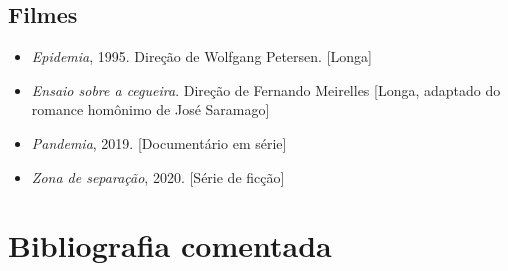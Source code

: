 \documentclass[12pt]{extarticle}
\begin{document}



\subsection{Filmes}

\begin{itemize}
\item \emph{Epidemia}, 1995. Direção de Wolfgang Petersen. {[}Longa{]}

\item \emph{Ensaio sobre a cegueira}. Direção de Fernando Meirelles {[}Longa,
adaptado do romance homônimo de José Saramago{]}

\item \emph{Pandemia}, 2019. {[}Documentário em série{]}

\item \emph{Zona de separação}, 2020. {[}Série de ficção{]}
\end{itemize}


\section{Bibliografia comentada}
\end{document}
